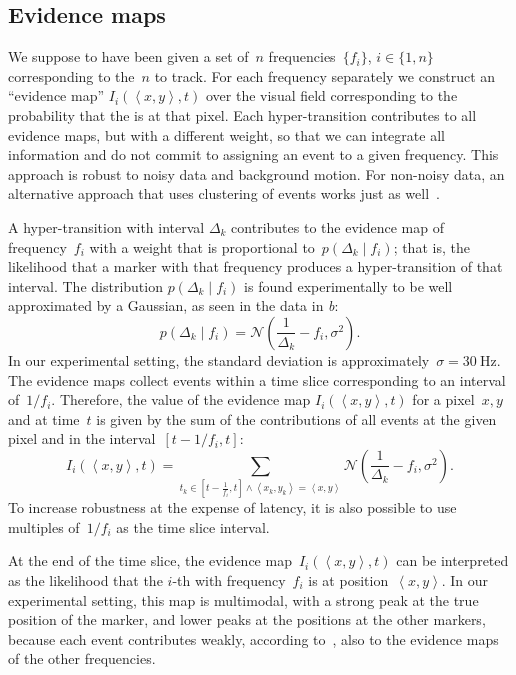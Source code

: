 \subsection{Evidence maps}

We suppose to have been given a set of~$n$ frequencies~$\{f_{i}\}$,
$i\in\{1,n\}$ corresponding to the~$n$ \ALMs to track. For each
frequency separately we construct an ``evidence map'' $I_{i}(\left\langle x,y\right\rangle ,t)$
over the visual field corresponding to the probability that the \ALM
is at that pixel. Each hyper-transition contributes to all evidence
maps, but with a different weight, so that we can integrate all information
and do not commit to assigning an event to a given frequency. This
approach is robust to noisy data and background motion. For non-noisy
data, an alternative approach that uses clustering of events works
just as well~\cite{Matthias}.

A hyper-transition with interval $\Delta_{k}$ contributes to the
evidence map of frequency~$f_{i}$ with a weight that is proportional
to~$p(\Delta_{k}\mid f_{i})$; that is, the likelihood that a marker
\ALM with that frequency produces a hyper-transition of that interval.
The distribution $p(\Delta_{k}\mid f_{i})$ is found experimentally
to be well approximated by a Gaussian, as seen in the data in \emph{b}:
\begin{equation}
p(\Delta_{k}\mid f_{i})=\mathcal{N}\left(\frac{1}{\Delta_{k}}-f_{i},\sigma^{2}\right).\label{eq:lik_delta}
\end{equation}
In our experimental setting, the standard deviation is approximately~$\sigma=30\ \mbox{Hz}$.
The evidence maps collect events within a time slice corresponding
to an interval of~$1/f_{i}$. Therefore, the value of the evidence
map $I_{i}(\left\langle x,y\right\rangle ,t)$ for a pixel~$x,y$
and at time~$t$ is given by the sum of the contributions of all
events at the given pixel and in the interval~$\left[t-1/f_{i},t\right]$:
\[
I_{i}(\left\langle x,y\right\rangle ,t)=\sum_{t_{k}\in\left[t-\frac{1}{f_{i}},t\right]\wedge\left\langle x_{k},y_{k}\right\rangle =\left\langle x,y\right\rangle }\mathcal{N}\left(\frac{1}{\Delta_{k}}-f_{i},\sigma^{2}\right).
\]
To increase robustness at the expense of latency, it is also possible
to use multiples of~$1/f_{i}$ as the time slice interval.

At the end of the time slice, the evidence map~$I_{i}(\left\langle x,y\right\rangle ,t)$
can be interpreted as the likelihood that the $i$-th \ALM with frequency~$f_{i}$
is at position~$\left\langle x,y\right\rangle $. In our experimental
setting, this map is multimodal, with a strong peak at the true position
of the marker, and lower peaks at the positions at the other markers,
because each event contributes weakly, according to~,
also to the evidence maps of the other frequencies. 

